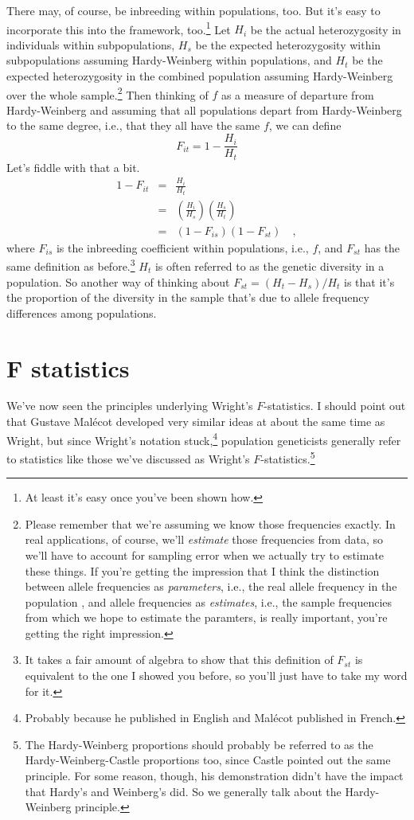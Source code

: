 There may, of course, be inbreeding within populations, too. But it's
easy to incorporate this into the framework, too.\footnote{At least
  it's easy once you've been shown how.} Let $H_i$ be the actual
heterozygosity in individuals within subpopulations, $H_s$ be the
expected heterozygosity within subpopulations assuming Hardy-Weinberg
within populations, and $H_t$ be the expected heterozygosity in the
combined population assuming Hardy-Weinberg over the whole
sample.\footnote{Please remember that we're assuming we know those
  frequencies exactly. In real applications, of course, we'll {\it
    estimate\/} those frequencies from data, so we'll have to account
  for sampling error when we actually try to estimate these things. If
  you're getting the impression that I think the distinction between
  allele frequencies as {\it parameters\/}, i.e., the real allele
  frequency in the population , and allele frequencies as {\it
    estimates\/}, i.e., the sample frequencies from which we hope to
  estimate the paramters, is really important, you're getting the
  right impression.}  Then thinking of $f$ as a measure of departure
from Hardy-Weinberg and assuming that all populations depart from
Hardy-Weinberg to the same degree, i.e., that they all have the same
$f$, we can define
\[
F_{it} = 1 - \frac{H_i}{H_t}
\]
Let's fiddle with that a bit.
\begin{eqnarray*}
1 - F_{it} &=& \frac{H_i}{H_t} \\
           &=& \left(\frac{H_i}{H_s}\right)\left(\frac{H_s}{H_t}\right) \\
           &=& (1 - F_{is})(1 - F_{st}) \quad ,
\end{eqnarray*}
where $F_{is}$ is the inbreeding coefficient within populations, i.e.,
$f$, and $F_{st}$ has the same definition as before.\footnote{It takes
  a fair amount of algebra to show that this definition of $F_{st}$ is
  equivalent to the one I showed you before, so you'll just have to
  take my word for it.} $H_t$ is often referred to as the genetic
diversity in a population. So another way of thinking about $F_{st} =
(H_t - H_s)/H_t$ is that it's the proportion of the diversity in the
sample that's due to allele frequency differences among populations.

\section*{F statistics}

We've now seen the principles underlying Wright's $F$-statistics. I
should point out that Gustave Mal{\'e}cot developed very similar ideas
at about the same time as Wright, but since Wright's notation
stuck,\footnote{Probably because he published in English and
  Mal{\'e}cot published in French.} population geneticists generally
refer to statistics like those we've discussed as Wright's
$F$-statistics.\footnote{The Hardy-Weinberg proportions should
  probably be referred to as the Hardy-Weinberg-Castle proportions
  too, since Castle pointed out the same principle. For some reason,
  though, his demonstration didn't have the impact that Hardy's and
  Weinberg's did. So we generally talk about the Hardy-Weinberg
  principle.}

